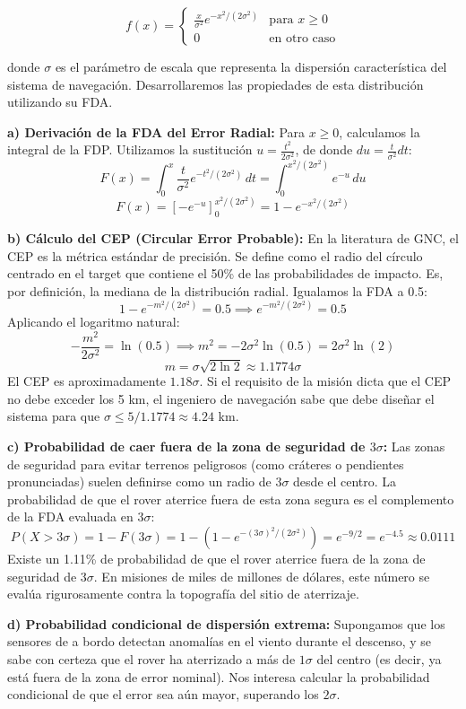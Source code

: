 $$
f(x) = 
\begin{cases} 
\frac{x}{\sigma^2} e^{-x^2 / (2\sigma^2)} & \text{para } x \ge 0 \\
0 & \text{en otro caso}
\end{cases}
$$

donde $\sigma$ es el parámetro de escala que representa la dispersión característica del sistema de navegación. Desarrollaremos las propiedades de esta distribución utilizando su FDA.

\textbf{a) Derivación de la FDA del Error Radial:}
Para $x \ge 0$, calculamos la integral de la FDP. Utilizamos la sustitución $u = \frac{t^2}{2\sigma^2}$, de donde $du = \frac{t}{\sigma^2} dt$:
$$ F(x) = \int_{0}^{x} \frac{t}{\sigma^2} e^{-t^2 / (2\sigma^2)} \, dt = \int_{0}^{x^2 / (2\sigma^2)} e^{-u} \, du $$
$$ F(x) = \left[ -e^{-u} \right]_{0}^{x^2 / (2\sigma^2)} = 1 - e^{-x^2 / (2\sigma^2)} $$

\textbf{b) Cálculo del CEP (Circular Error Probable):}
En la literatura de GNC, el CEP es la métrica estándar de precisión. Se define como el radio del círculo centrado en el target que contiene el 50\% de las probabilidades de impacto. Es, por definición, la mediana de la distribución radial. Igualamos la FDA a 0.5:
$$ 1 - e^{-m^2 / (2\sigma^2)} = 0.5 \implies e^{-m^2 / (2\sigma^2)} = 0.5 $$
Aplicando el logaritmo natural:
$$ -\frac{m^2}{2\sigma^2} = \ln(0.5) \implies m^2 = -2\sigma^2 \ln(0.5) = 2\sigma^2 \ln(2) $$
$$ m = \sigma \sqrt{2 \ln 2} \approx 1.1774 \sigma $$
El CEP es aproximadamente $1.18 \sigma$. Si el requisito de la misión dicta que el CEP no debe exceder los 5 km, el ingeniero de navegación sabe que debe diseñar el sistema para que $\sigma \le 5 / 1.1774 \approx 4.24$ km.

\textbf{c) Probabilidad de caer fuera de la zona de seguridad de $3\sigma$:}
Las zonas de seguridad para evitar terrenos peligrosos (como cráteres o pendientes pronunciadas) suelen definirse como un radio de $3\sigma$ desde el centro. La probabilidad de que el rover aterrice fuera de esta zona segura es el complemento de la FDA evaluada en $3\sigma$:
$$ P(X > 3\sigma) = 1 - F(3\sigma) = 1 - \left( 1 - e^{-(3\sigma)^2 / (2\sigma^2)} \right) = e^{-9/2} = e^{-4.5} \approx 0.0111 $$
Existe un 1.11\% de probabilidad de que el rover aterrice fuera de la zona de seguridad de $3\sigma$. En misiones de miles de millones de dólares, este número se evalúa rigurosamente contra la topografía del sitio de aterrizaje.

\textbf{d) Probabilidad condicional de dispersión extrema:}
Supongamos que los sensores de a bordo detectan anomalías en el viento durante el descenso, y se sabe con certeza que el rover ha aterrizado a más de $1\sigma$ del centro (es decir, ya está fuera de la zona de error nominal). Nos interesa calcular la probabilidad condicional de que el error sea aún mayor, superando los $2\sigma$. 


